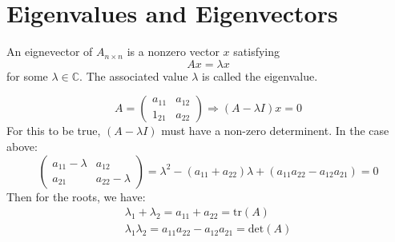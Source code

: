 \documentclass[11pt,fleqn]{book} %
\begin{document}
\section{Eigenvalues and Eigenvectors}

\begin{definition}
	An eignevector of $A_{n \times n}$ is a nonzero vector $x$ satisfying 
	\begin{equation}
		Ax = \lambda x
	\end{equation}
	for some $ \lambda \in \mathbb{C}$. The associated value $\lambda$ is called the eigenvalue. 
\end{definition}

\begin{example}
	\begin{equation}
		A = \begin{pmatrix}
			a_{11} & a_{12} \\
			1_{21} & a_{22}
		\end{pmatrix} \Rightarrow (A - \lambda I) x = 0
	\end{equation}
	For this to be true, $(A - \lambda I)$ must have a non-zero determinent. In the case above:
	\begin{equation*}
		\begin{pmatrix}
			a_{11} - \lambda & a_{12} \\
			a_{21} & a_{22} - \lambda			
		\end{pmatrix} =  \lambda^2 - (a_{11} + a_{22}) \lambda + (a_{11}a_{22} - a_{12}a_{21}) = 0
	\end{equation*} 
	Then for the roots, we have:
	\begin{align}
		\lambda_1 + \lambda_2 = a_{11} + a_{22} = \text{tr}(A) \\ 
		\lambda_1 \lambda_2 = a_{11} a_{22} - a_{12} a_{21} = \text{det} (A)
	\end{align}
\end{example}
\end{document}
